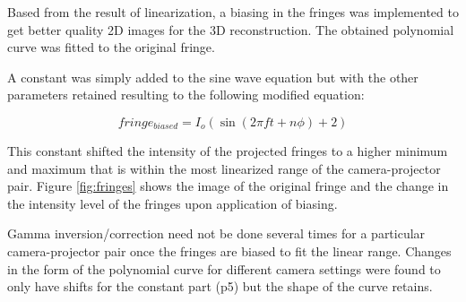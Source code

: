 Based from the result of linearization, a biasing in the fringes was implemented to get better quality 2D images for the 3D reconstruction.
The obtained polynomial curve was fitted to the original fringe.

A constant was simply added to the sine wave equation but with the other parameters retained resulting to the following modified equation: 

\begin{equation}
fringe_{biased} = I_o(\sin(2\pi f t + n\phi) + 2)
\end{equation}

This constant shifted the intensity of the projected fringes to a higher minimum and maximum that is within the most linearized range of the camera-projector pair. Figure \ref{fig:fringes} shows the image of the original fringe and the change in the intensity level of the fringes upon application of biasing.

Gamma inversion/correction need not be done several times for a particular camera-projector pair once the fringes are biased to fit the linear range. Changes in the form of the polynomial curve for different camera settings were found to only have shifts for the constant part (p5) but the shape of the curve retains. 
